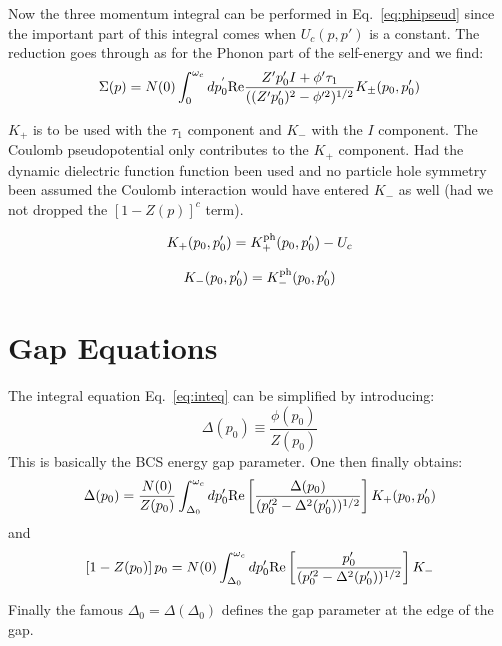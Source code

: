 Now the three momentum integral can be performed in Eq.~\ref{eq:phipseud} since the important
part of this integral comes when $U_{c}(p,p')$ is a constant. The reduction goes through as for the 
Phonon part of the self-energy and we find:
%
\begin{equation}
\label{eq:inteq}
\Sigma(p) = N(0) \int_{0}^{\omega_{c}}dp^{'}_{0} {\rm Re} \frac{Z'p_{0}'I + \phi'\tau_{1}}{((Z'p_{0}')^{2} - \phi'^{2})^{1/2}} K_{\pm}(p_{0}, p_{0}')
\end{equation}
%

$K_{+}$ is to be used with the $\tau_{1}$ component and $K_{-}$ with the $I$ component. The Coulomb pseudopotential only contributes
to the $K_{+}$ component. Had the dynamic dielectric function function been used and no particle hole symmetry been assumed the
Coulomb interaction would have entered $K_{-}$ as well (had we not dropped the $[1-Z(p)]^{c}$ term).

%
\begin{equation}
K_{+} (p_{0},p_{0}') = K _{+}^{\rm ph}(p_{0},p_{0}') - U_{c}
\end{equation}

\begin{equation}
K_{-} (p_{0},p_{0}') = K _{-}^{\rm ph}(p_{0},p_{0}') 
\end{equation}

\section{Gap Equations}
%
The integral equation Eq.~\ref{eq:inteq} can be simplified by introducing:
%
\begin{equation}
\Delta(p_{0}) \equiv \frac{\phi(p_{0})}{Z(p_{0})} 
\end{equation}
%
This is basically the BCS energy gap parameter. One then finally obtains:
%
\begin{equation}
\Delta(p_{0}) = \frac{N(0)}{Z(p_{0})} \int_{\Delta_{0}}^{\omega_{c}} d p_{0}' {\rm Re} \left[ 
\frac{\Delta(p_{0})}{(p_{0}'^{2} - \Delta^{2}(p_{0}'))^{1/2}} 
\right]K_{+}(p_{0}, p_{0}') 
\end{equation}
%
and
%
\begin{equation}
\left[ 1-Z(p_{0}) \right] p_{0} = N(0) \int_{\Delta_{0}}^{\omega_{c}}d p_{0}'
{\rm Re} \left[ \frac{p_{0}'}{(p_{0}'^{2} - \Delta^{2}(p_{0}'))^{1/2}}\right]K_{-}
\end{equation}

Finally the famous $\Delta_{0} = \Delta(\Delta_{0})$ defines the gap parameter at the edge
of the gap.


